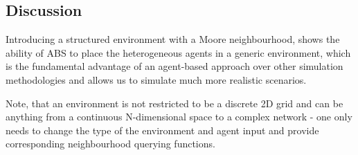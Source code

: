 \subsection{Discussion}
Introducing a structured environment with a Moore neighbourhood, shows the ability of ABS to place the heterogeneous agents in a generic environment, which is the fundamental advantage of an agent-based approach over other simulation methodologies and allows us to simulate much more realistic scenarios.

Note, that an environment is not restricted to be a discrete 2D grid and can be anything from a continuous N-dimensional space to a complex network - one only needs to change the type of the environment and agent input and provide corresponding neighbourhood querying functions. 